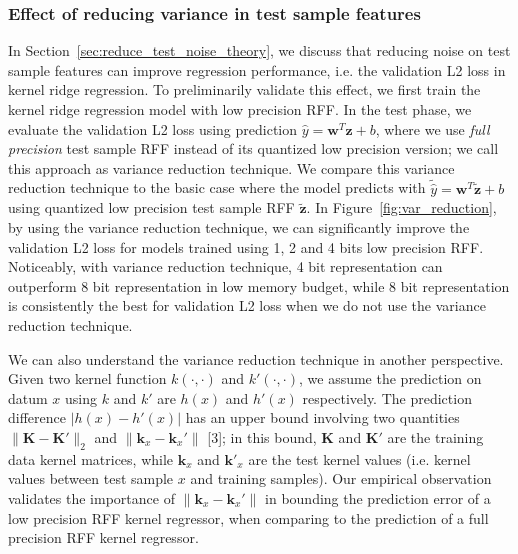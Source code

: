 \subsubsection{Effect of reducing variance in test sample features}
\label{subsubsec:test_var_reduce}
In Section~\ref{sec:reduce_test_noise_theory}, we discuss that reducing noise on test sample features can improve regression performance, i.e. the validation L2 loss in kernel ridge regression. 
To preliminarily validate this effect, we first train the kernel ridge regression model with low precision RFF. In the test phase, we evaluate the validation L2 loss using prediction $\hat{y}=\bm{w}^T\bm{z} + b$, where we use \emph{full precision} test sample RFF instead of its quantized low precision version; we call this approach as variance reduction technique. We compare this variance reduction technique to the basic case where the model predicts with $\tilde{\hat{y}}=\bm{w}^T\tilde{\bm{z}} + b$ using quantized low precision test sample RFF $\tilde{\bm{z}}$. In Figure~\ref{fig:var_reduction}, by using the variance reduction technique, we can significantly improve the validation L2 loss for models trained using 1, 2 and 4 bits low precision RFF. Noticeably, with variance reduction technique, 4 bit representation can outperform 8 bit representation in low memory budget, while 8 bit representation is consistently the best for validation L2 loss when we do not use the variance reduction technique.

We can also understand the variance reduction technique in another perspective. Given two kernel function $k(\cdot, \cdot)$ and $k'(\cdot, \cdot)$, we assume the prediction on datum $x$ using $k$ and $k'$ are $h(x)$ and $h'(x)$ respectively. The prediction difference $|h(x) - h'(x)|$ has an upper bound involving two quantities $\| \bm{K} - \bm{K}' \|_2$ and $\| \bm{k}_x - \bm{k}_x' \|$ [3]; in this bound, $\bm{K}$ and $\bm{K}'$ are the training data kernel matrices, while $\bm{k}_x$ and $\bm{k}'_x$ are the test kernel values (i.e. kernel values between test sample $x$ and training samples).
Our empirical observation validates the importance of $\| \bm{k}_x - \bm{k}_x' \|$ in bounding the prediction error of a low precision RFF kernel regressor, when comparing to the prediction of a full precision RFF kernel regressor. 



